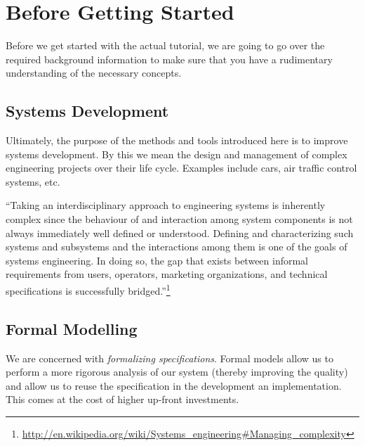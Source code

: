 \section{Before Getting Started}
\label{tut_before_getting_started}

Before we get started with the actual tutorial, we are going to go over the required background information to make sure that you have a rudimentary understanding of the necessary concepts.


\subsection{Systems Development}
\label{tut_systems_development}

Ultimately, the purpose of the methods and tools introduced here is to improve systems development.  By this we mean the design and management of complex engineering projects over their life cycle. Examples include cars, air traffic control systems, etc.

``Taking an interdisciplinary approach to engineering systems is inherently complex since the behaviour of and interaction among system components is not always immediately well defined or understood. Defining and characterizing such systems and subsystems and the interactions among them is one of the goals of systems engineering. In doing so, the gap that exists between informal requirements from users, operators, marketing organizations, and technical specifications is successfully bridged.''\footnote{\url{http://en.wikipedia.org/wiki/Systems_engineering\#Managing_complexity}}

\subsection{Formal Modelling}
\label{tut_formal_modelling}

We are concerned with \textit{formalizing specifications}.  Formal models allow us to perform a more rigorous analysis of our system (thereby improving the quality) and allow us to reuse the specification in the development an implementation.  This comes at the cost of higher up-front investments.

